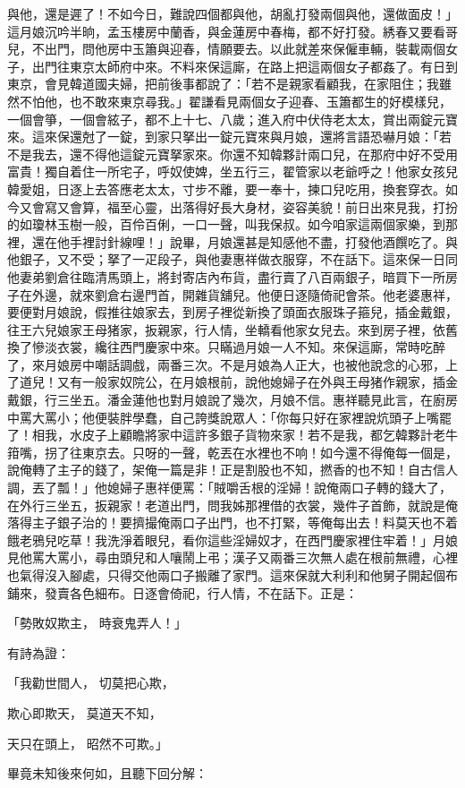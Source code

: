 \begin{showcontents}{}
與他，還是遲了！不如今日，難說四個都與他，胡亂打發兩個與他，還做面皮！」這月娘沉吟半晌，孟玉樓房中蘭香，與金蓮房中春梅，都不好打發。綉春又要看哥兒，不出門，問他房中玉簫與迎春，情願要去。以此就差來保僱車輛，裝載兩個女子，出門往東京太師府中來。不料來保這廝，在路上把這兩個女子都姦了。有日到東京，會見韓道國夫婦，把前後事都說了：「若不是親家看顧我，在家阻住；我雖然不怕他，也不敢來東京尋我。」翟謙看見兩個女子迎春、玉簫都生的好模樣兒，一個會箏，一個會絃子，都不上十七、八歲；進入府中伏侍老太太，賞出兩錠元寶來。這來保還尅了一錠，到家只拏出一錠元寶來與月娘，還將言語恐嚇月娘：「若不是我去，還不得他這錠元寶拏家來。你還不知韓夥計兩口兒，在那府中好不受用富貴！獨自着住一所宅子，呼奴使婢，坐五行三，翟管家以老爺呼之！他家女孩兒韓愛姐，日逐上去答應老太太，寸步不離，要一奉十，揀口兒吃用，換套穿衣。如今又會寫又會算，福至心靈，出落得好長大身材，姿容美貌！前日出來見我，打扮的如瓊林玉樹一般，百伶百俐，一口一聲，叫我保叔。如今咱家這兩個家樂，到那裡，還在他手裡討針線哩！」說畢，月娘還甚是知感他不盡，打發他酒饌吃了。與他銀子，又不受；拏了一疋段子，與他妻惠祥做衣服穿，不在話下。這來保一日同他妻弟劉倉往臨清馬頭上，將封寄店內布貨，盡行賣了八百兩銀子，暗買下一所房子在外邊，就來劉倉右邊門首，開雜貨舖兒。他便日逐隨倚祀會茶。他老婆惠祥，要便對月娘說，假推往娘家去，到房子裡從新換了頭面衣服珠子箍兒，插金戴銀，往王六兒娘家王母猪家，扳親家，行人情，坐轎看他家女兒去。來到房子裡，依舊換了慘淡衣裳，纔往西門慶家中來。只瞞過月娘一人不知。來保這廝，常時吃醉了，來月娘房中嘲話調戲，兩番三次。不是月娘為人正大，也被他說念的心邪，上了道兒！又有一般家奴院公，在月娘根前，說他媳婦子在外與王母猪作親家，插金戴銀，行三坐五。潘金蓮他也對月娘說了幾次，月娘不信。惠祥聽見此言，在廚房中罵大罵小；他便裝胖學蠢，自己誇獎說眾人：「你每只好在家裡說炕頭子上嘴罷了！相我，水皮子上顧瞻將家中這許多銀子貨物來家！若不是我，都乞韓夥計老牛箝嘴，拐了往東京去。只呀的一聲，乾丟在水裡也不响！如今還不得俺每一個是，說俺轉了主子的錢了，架俺一篇是非！正是割股也不知，撚香的也不知！自古信人調，丟了瓢！」他媳婦子惠祥便罵：「賊嚼舌根的淫婦！說俺兩口子轉的錢大了，在外行三坐五，扳親家！老道出門，問我姊那裡借的衣裳，幾件子首飾，就說是俺落得主子銀子治的！要擠撮俺兩口子出門，也不打緊，等俺每出去！料莫天也不着餓老鴉兒吃草！我洗淨着眼兒，看你這些淫婦奴才，在西門慶家裡住牢着！」月娘見他罵大罵小，尋由頭兒和人嚷鬧上弔；漢子又兩番三次無人處在根前無禮，心裡也氣得沒入腳處，只得交他兩口子搬離了家門。這來保就大利利和他舅子開起個布鋪來，發賣各色細布。日逐會倚祀，行人情，不在話下。正是：

「勢敗奴欺主，  時衰鬼弄人！」

有詩為證：

「我勸世間人，  切莫把心欺，

欺心即欺天，  莫道天不知，

天只在頭上，  昭然不可欺。」

畢竟未知後來何如，且聽下回分解：





\end{showcontents}


